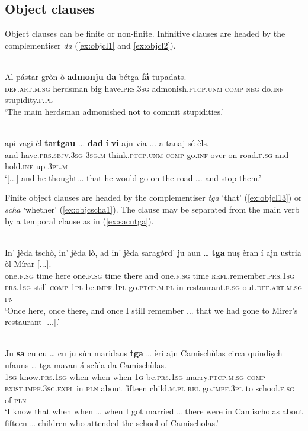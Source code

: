 \subsection{Object clauses}
Object clauses can be finite or non-finite. Infinitive clauses are headed by the complementiser \textit{da} (\ref{ex:objcl1} and \ref{ex:objcl2}).

\ea
\label{ex:objcl1}
\\
\gll Al pástar gròn ò \textbf{admonju} \textbf{da} bétga \textbf{fá} tupadats.\\
\textsc{def.art.m.sg} herdsman big have.\textsc{prs.3sg} admonish.\textsc{ptcp.unm} \textsc{comp} \textsc{neg} do.\textsc{inf} stupidity.\textsc{f.pl}\\
\glt `The main herdsman admonished not to commit stupidities.'
\z

\ea
\label{ex:objcl2}
\\
\gll  [...] api vagi èl \textbf{tartgau} ... \textbf{dad} \textbf{í} \textbf{vi} ajn via ... a tanaj sé èls.  \\
{} and have.\textsc{prs.sbjv.3sg} \textsc{3sg.m} think.\textsc{ptcp.unm} {} \textsc{comp} go.\textsc{inf} over on road.\textsc{f.sg} {} and hold.\textsc{inf} up \textsc{3pl.m}\\
\glt `[...] and he thought... that he would go on the road ... and stop them.'
\z

Finite object clauses are headed by the complementiser \textit{tga} `that' (\ref{ex:objcl13}) or \textit{scha} `whether' (\ref{ex:objcscha1}). The clause may be separated from the main verb by a temporal clause as in (\ref{ex:sacutga}).

\ea
\label{ex:objcl13}
\\
\gll    In’ jèda tschò, in’ jèda lò, ad in’ jèda saragòrd’ ju aun … \textbf{tga} nuṣ èran í ajn ustria òl Mírar [...].\\
one.\textsc{f.sg} time here one.\textsc{f.sg} time there and one.\textsc{f.sg} time \textsc{refl}.remember.\textsc{prs.1sg} \textsc{prs.1sg} still {} \textsc{comp} \textsc{1pl} be.\textsc{impf.1pl} go.\textsc{ptcp.m.pl} in restaurant.\textsc{f.sg} out.\textsc{def.art.m.sg} \textsc{pn}\\
\glt `Once here, once there, and once I still remember ... that we had gone to Mirer's restaurant [...].'
\z

\ea
\label{ex:sacutga}
\\
\gll    Ju \textbf{sa} cu cu … cu ju sùn maridaus \textbf{tga} … èri ajn Camischùlas circa quindiṣch ufauns … tga mavan á scùla da Camischùlas.\\
\textsc{1sg} know.\textsc{prs.1sg} when when {} when \textsc{1g} be.\textsc{prs.1sg}  marry.\textsc{ptcp.m.sg} \textsc{comp} {} \textsc{exist.impf.3sg.expl} in \textsc{pln} about fifteen child.\textsc{m.pl} {} \textsc{rel} go.\textsc{impf.3pl} to school.\textsc{f.sg} of  \textsc{pln}\\
\glt `I know that when when … when I got married … there were in Camischolas about fifteen … children who attended the school of Camischolas.'
\z

